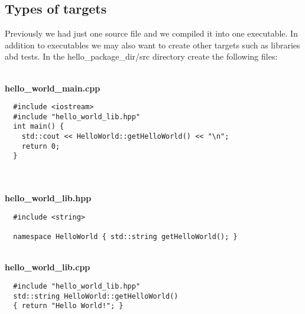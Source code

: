 \documentclass[12pt]{article}
\begin{document}
\subsection{Types of targets}

Previously we had just one source
file and we compiled it into one executable.  In addition to
executables we may also want to create other targets such as libraries
abd tests.  In the hello\_package\_dir/src directory create the
following files:
 
\textbf{\\hello\_world\_main.cpp}
\begin{verbatim}
  #include <iostream>
  #include "hello_world_lib.hpp"
  int main() {
    std::cout << HelloWorld::getHelloWorld() << "\n";
    return 0;
  }
\end{verbatim}\\

\textbf{\\hello\_world\_lib.hpp}
\begin{verbatim}
  #include <string>
  
  namespace HelloWorld { std::string getHelloWorld(); }
\end{verbatim}

\textbf{\\hello\_world\_lib.cpp}
\begin{verbatim}
  #include "hello_world_lib.hpp"
  std::string HelloWorld::getHelloWorld()
  { return "Hello World!"; }
\end{verbatim}
\end{document}
